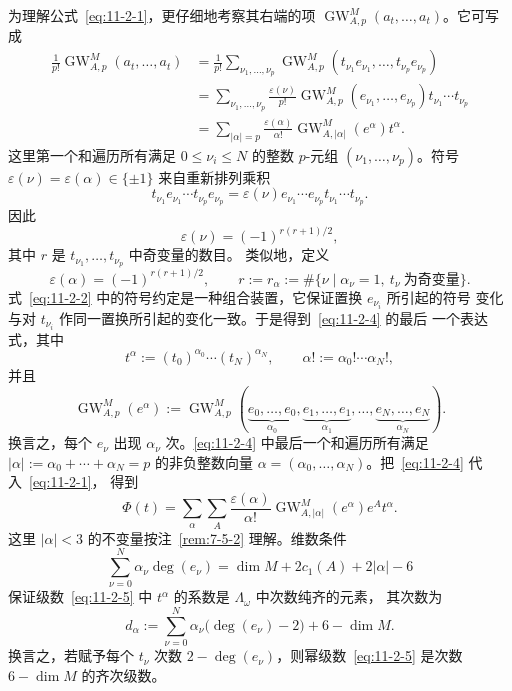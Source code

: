 为理解公式~\eqref{eq:11-2-1}，更仔细地考察其右端的项
$\operatorname{GW}_{A,p}^M(a_t,\ldots,a_t)$。它可写成
\begin{equation}\label{eq:11-2-4}
\begin{aligned}
  \frac1{p!}\operatorname{GW}_{A,p}^M(a_t,\ldots,a_t)
  &=
  \frac1{p!}\sum_{\nu_1,\ldots,\nu_p}
  \operatorname{GW}_{A,p}^M
  (t_{\nu_1}e_{\nu_1},\ldots,t_{\nu_p}e_{\nu_p})\\
  &=
  \sum_{\nu_1,\ldots,\nu_p}\frac{\varepsilon(\nu)}{p!}
  \operatorname{GW}_{A,p}^M(e_{\nu_1},\ldots,e_{\nu_p})
  t_{\nu_1}\cdots t_{\nu_p}\\
  &=
  \sum_{|\alpha|=p}\frac{\varepsilon(\alpha)}{\alpha!}
  \operatorname{GW}_{A,|\alpha|}^M(e^\alpha)t^\alpha.
\end{aligned}
\end{equation}
这里第一个和遍历所有满足 $0\le\nu_i\le N$ 的整数 $p$-元组
$(\nu_1,\ldots,\nu_p)$。符号
$\varepsilon(\nu)=\varepsilon(\alpha)\in\{\pm1\}$ 来自重新排列乘积
\[
  t_{\nu_1}e_{\nu_1}\cdots t_{\nu_p}e_{\nu_p}
  =\varepsilon(\nu)e_{\nu_1}\cdots e_{\nu_p}
  t_{\nu_1}\cdots t_{\nu_p}.
\]
因此
\[
  \varepsilon(\nu)=(-1)^{r(r+1)/2},
\]
其中 $r$ 是 $t_{\nu_1},\ldots,t_{\nu_p}$ 中奇变量的数目。
类似地，定义
\[
  \varepsilon(\alpha)=(-1)^{r(r+1)/2},\qquad
  r:=r_\alpha:=\#\{\nu\mid\alpha_\nu=1,\ t_\nu\ \text{为奇变量}\}.
\]
式~\eqref{eq:11-2-2} 中的符号约定是一种组合装置，它保证置换 $e_{\nu_i}$ 所引起的符号
变化与对 $t_{\nu_i}$ 作同一置换所引起的变化一致。于是得到~\eqref{eq:11-2-4} 的最后
一个表达式，其中
\[
  t^\alpha:=(t_0)^{\alpha_0}\cdots(t_N)^{\alpha_N},
  \qquad \alpha!:=\alpha_0!\cdots\alpha_N!,
\]
并且
\[
  \operatorname{GW}_{A,p}^M(e^\alpha)
  :=\operatorname{GW}_{A,p}^M(
  \underbrace{e_0,\ldots,e_0}_{\alpha_0},
  \underbrace{e_1,\ldots,e_1}_{\alpha_1},
  \ldots,
  \underbrace{e_N,\ldots,e_N}_{\alpha_N}).
\]
换言之，每个 $e_\nu$ 出现 $\alpha_\nu$ 次。\eqref{eq:11-2-4} 中最后一个和遍历所有满足
$|\alpha|:=\alpha_0+\cdots+\alpha_N=p$ 的非负整数向量
$\alpha=(\alpha_0,\ldots,\alpha_N)$。把~\eqref{eq:11-2-4} 代入~\eqref{eq:11-2-1}，
得到
\begin{equation}\label{eq:11-2-5}
  \Phi(t)=\sum_\alpha\sum_A\frac{\varepsilon(\alpha)}{\alpha!}
  \operatorname{GW}_{A,|\alpha|}^M(e^\alpha)e^At^\alpha.
\end{equation}
这里 $|\alpha|<3$ 的不变量按注~\ref{rem:7-5-2} 理解。维数条件
\begin{equation}\label{eq:11-2-6}
  \sum_{\nu=0}^N\alpha_\nu\deg(e_\nu)
  =\dim M+2c_1(A)+2|\alpha|-6
\end{equation}
保证级数~\eqref{eq:11-2-5} 中 $t^\alpha$ 的系数是 $\Lambda_\omega$ 中次数纯齐的元素，
其次数为
\[
  d_\alpha:=\sum_{\nu=0}^N\alpha_\nu\bigl(\deg(e_\nu)-2\bigr)+6-\dim M.
\]
换言之，若赋予每个 $t_\nu$ 次数 $2-\deg(e_\nu)$，则幂级数~\eqref{eq:11-2-5} 是次数
$6-\dim M$ 的齐次级数。

